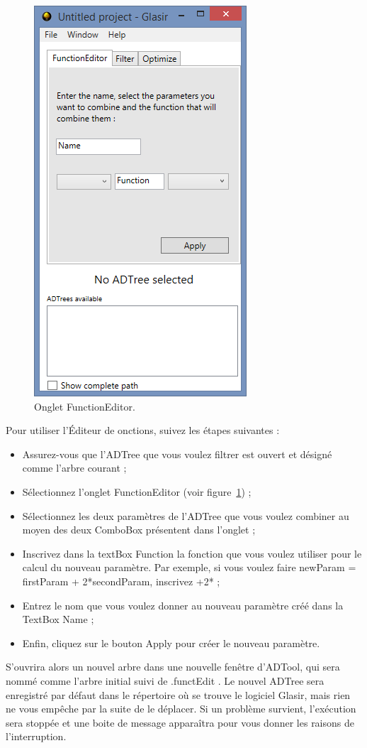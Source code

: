  \begin{figure}[H]
        \centering
        \includegraphics[height=0.7\textwidth]{figure/functionEdition.png}
        \caption{Onglet FunctionEditor.}
        \label{fig:functEdit}
    \end{figure}

Pour utiliser l'Éditeur de onctions,  suivez les étapes suivantes : 

\begin{itemize}
\item Assurez-vous que l'ADTree que vous voulez filtrer est ouvert et désigné comme l'arbre courant ;
\item Sélectionnez l'onglet \og FunctionEditor \fg{} (voir {\sc figure}~\ref{fig:functEdit}) ;
\item Sélectionnez les deux paramètres de l'ADTree que vous voulez combiner au moyen des deux ComboBox présentent dans l'onglet ;
\item Inscrivez dans la textBox \og Function \fg{} la fonction que vous voulez utiliser pour le calcul du nouveau paramètre. Par exemple, si vous voulez faire \og newParam = firstParam + 2*secondParam\fg , inscrivez \og +2* \fg{} ;
\item Entrez le nom que vous voulez donner au nouveau paramètre créé dans la TextBox \og Name \fg{} ;
\item Enfin, cliquez sur le bouton \og Apply\fg{} pour créer le nouveau paramètre.
\end{itemize} 

S'ouvrira alors un nouvel arbre dans une nouvelle fenêtre d'ADTool, qui sera nommé comme l'arbre initial suivi de \og .functEdit \fg{} . Le nouvel ADTree sera enregistré par défaut dans le répertoire où se trouve le logiciel Glasir, mais rien ne vous empêche par la suite de le déplacer. 
Si un problème survient, l'exécution sera stoppée et une boite de message apparaîtra pour vous donner les raisons de l'interruption.

